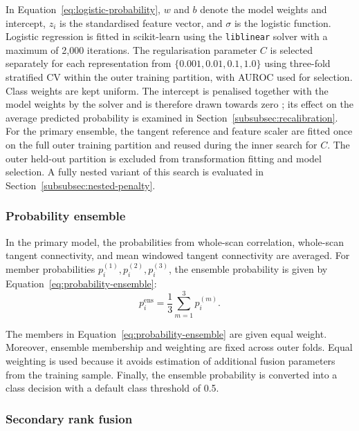 In Equation~\eqref{eq:logistic-probability}, $w$ and $b$ denote the model weights and intercept, $z_i$ is the standardised feature vector, and $\sigma$ is the logistic function. Logistic regression is fitted in scikit-learn \citep{Pedregosaetal2011} using the \texttt{liblinear} solver with a maximum of 2,000 iterations. The regularisation parameter $C$ is selected separately for each representation from $\{0.001,0.01,0.1,1.0\}$ using three-fold stratified CV within the outer training partition, with AUROC used for selection. Class weights are kept uniform. The intercept is penalised together with the model weights by the solver and is therefore drawn towards zero \citep{Fanetal2008}; its effect on the average predicted probability is examined in Section~\ref{subsubsec:recalibration}. For the primary ensemble, the tangent reference and feature scaler are fitted once on the full outer training partition and reused during the inner search for $C$. The outer held-out partition is excluded from transformation fitting and model selection. A fully nested variant of this search is evaluated in Section~\ref{subsubsec:nested-penalty}.

\subsubsection{Probability ensemble}
\label{subsubsec:probability-ensemble}

In the primary model, the probabilities from whole-scan correlation, whole-scan tangent
connectivity, and mean windowed tangent connectivity are averaged. For member
probabilities $p_i^{(1)},p_i^{(2)},p_i^{(3)}$, the ensemble probability is given by
Equation~\eqref{eq:probability-ensemble}:
\begin{equation}
p_i^{\mathrm{ens}}
=
\frac{1}{3}
\sum_{m=1}^{3}p_i^{(m)}.
\label{eq:probability-ensemble}
\end{equation}

The members in Equation~\eqref{eq:probability-ensemble} are given equal weight. Moreover, ensemble
membership and weighting are fixed across outer folds. Equal weighting is used because it
avoids estimation of additional fusion parameters from the training sample. Finally, the
ensemble probability is converted into a class decision with a default class threshold of
0.5.

\subsubsection{Secondary rank fusion}
\label{subsubsec:rank-fusion}

